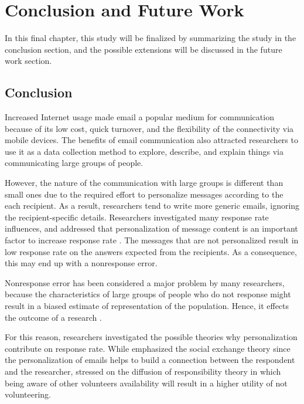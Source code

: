 \chapter{Conclusion and Future Work}
\label{chp:6:ConcFutu}

In this final chapter, this study will be finalized by summarizing the study in the conclusion section, and the possible extensions will be discussed in the future work section.

\section{Conclusion}
\label{sec:6.1:Conc}

Increased Internet usage made email a popular medium for communication because of its low cost, quick turnover, and the flexibility of the connectivity via mobile devices. The benefits of email communication also attracted researchers to use it as a data collection method to explore, describe, and explain things via communicating large groups of people.
\vspace{1cm}

However, the nature of the communication with large groups is different than small ones due to the required effort to personalize messages according to the each recipient. As a result, researchers tend to write more generic emails, ignoring the recipient-specific details. Researchers investigated many response rate influences, and addressed that personalization of message content is an important factor to increase response rate \citep{Dillman1991,Schaefer1998}. The messages that are not personalized result in low response rate on the answers expected from the recipients. As a consequence, this may end up with a nonresponse error.
\vspace{1cm}

Nonresponse error has been considered a major problem by many researchers, because the characteristics of large groups of people who do not response might result in a biased estimate of representation of the population. Hence, it effects the outcome of a research \citep{Bogen1996}.
\vspace{1cm}

For this reason, researchers investigated the possible theories why personalization contribute on response rate. While \cite{DillmanDonA.SmythJoleneD.Christian2009} emphasized the social exchange theory since the personalization of emails helps to build a connection between the respondent and the researcher, \cite{Barron2002} stressed on the diffusion of responsibility theory in which being aware of other volunteers availability will result in a higher utility of not volunteering.
\vspace{1cm}

